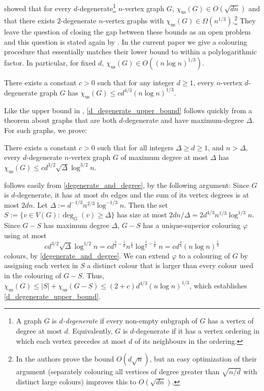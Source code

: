 \documentclass{patmorin}
\newcommand{\defin}[1]{\emph{\color{brightmaroon}#1}}
\newcommand{\trn}{\chi_{\mathrm{us}}}
\begin{document}
\citet{karpas.neiman.ea:on}  showed that for every $d$-degenerate\footnote{A graph $G$ is \defin{$d$-degenerate} if every non-empty subgraph of $G$ has a vertex of degree at most $d$.  Equivalently, $G$ is $d$-degenerate if it has a vertex ordering in which each vertex precedes at most $d$ of its neighbours in the ordering.} $n$-vertex graph $G$, $\trn(G)\in O(\sqrt{dn})$ and that there exists $2$-degenerate $n$-vertex graphs with $\trn(G)\in\Omega(n^{1/3})$.\footnote{In \cite[Theorem~6.2]{karpas.neiman.ea:on} the authors prove the bound $O(d\sqrt{n})$, but an easy optimization of their argument (separately colouring all vertices of degree greater than $\sqrt{n/d}$ with distinct large colours) improves this to $O(\sqrt{dn})$.}  They leave the question of closing the gap between these bounds as an open problem and this question is stated again by \citet{bose.dujmovic.ea:asymptotically}. 
In the current paper we give a colouring procedure that essentially matches their lower bound to within a polylogarithmic factor.  In particular, for fixed $d$, $\trn(G)\in O((n\log n)^{1/3})$.

\begin{thm}\label{d_degenerate_upper_bound}
  There exists a constant $c>0$ such that for any integer $d\ge 1$, every $n$-vertex $d$-degenerate graph $G$ has $\trn(G) \le c d^{4/3}(n\log n)^{1/3}$.
\end{thm}

Like the upper bound in \cite{karpas.neiman.ea:on}, \cref{d_degenerate_upper_bound} follows quickly from a theorem about graphs that are both $d$-degenerate and have maximum-degree $\Delta$. For such graphs, we prove:

\begin{thm}\label{degenerate_and_degree}
  There exists a constant $c>0$ such that
  for all integers $\Delta\ge d \ge 1$, and $n> \Delta$, every $d$-degenerate $n$-vertex graph $G$ of maximum degree at most $\Delta$ has
  $\trn(G)\leq cd^{3/2}\sqrt{\Delta}\log^{3/2} n$.
\end{thm}

 follows easily from \cref{degenerate_and_degree}, by the following argument:  Since $G$ is $d$-degenerate, it has at most $dn$ edges and the sum of its vertex degrees is at most $2dn$.  Let $\Delta:=d^{-1/3}n^{2/3}\log^{-1/3} n$.  Then the set $S:=\{v\in V(G):\deg_G(v)\ge \Delta\}$ has size at most $2dn/\Delta=2d^{4/3}n^{1/3}\log^{1/3} n$.  Since $G-S$ has maximum degree $\Delta$, $G-S$ has a unique-superior colouring $\varphi$ using at most
\[
  cd^{3/2}\sqrt{\Delta}\log^{1/2} n
  = c d^{\tfrac{3}{2}-\tfrac{1}{6}}n^{\tfrac{1}{3}}\log^{\tfrac{1}{2}-\tfrac{1}{6}} n
  = c d^{\tfrac{4}{3}}(n\log n)^{\tfrac{1}{3}}
\]
colours, by \cref{degenerate_and_degree}. We can extend $\varphi$ to a colouring of $G$ by assigning each vertex in $S$ a distinct colour that is larger than every colour used in the colouring of $G-S$.  Thus, $\trn(G)\le |S|+\trn(G-S)\le (2+c)d^{4/3}(n\log n)^{1/3}$, which establishes \cref{d_degenerate_upper_bound}.
\end{document}
